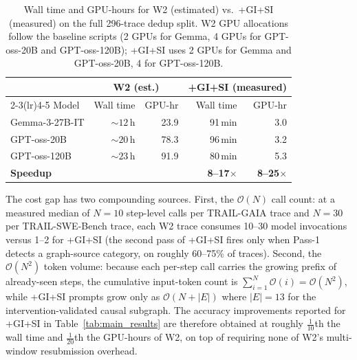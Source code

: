 \begin{table}[h]
\centering
\small
\caption{Wall time and GPU-hours for \textsc{W2} (estimated) vs.\
\textsc{+GI+SI} (measured) on the full 296-trace dedup split.
\textsc{W2} GPU allocations follow the baseline scripts (2 GPUs for
Gemma, 4 GPUs for GPT-oss-20B and GPT-oss-120B);
\textsc{+GI+SI} uses 2 GPUs for Gemma and GPT-oss-20B, 4 for
GPT-oss-120B.}
\label{tab:w2_efficiency}
\begin{tabular}{lrrrr}
\toprule
 & \multicolumn{2}{c}{\textsc{W2} (est.)} & \multicolumn{2}{c}{\textsc{+GI+SI} (measured)} \\
\cmidrule(lr){2-3}\cmidrule(lr){4-5}
Model & Wall time & GPU-hr & Wall time & GPU-hr \\
\midrule
Gemma-3-27B-IT    & ${\sim}12$\,h & 23.9 & 91\,min & 3.0 \\
GPT-oss-20B       & ${\sim}20$\,h & 78.3 & 96\,min & 3.2 \\
GPT-oss-120B      & ${\sim}23$\,h & 91.9 & 80\,min & 5.3 \\
\midrule
\textbf{Speedup}  & \multicolumn{2}{c}{} & \textbf{8--17$\times$} & \textbf{8--25$\times$} \\
\bottomrule
\end{tabular}
\end{table}

The cost gap has two compounding sources.
First, the $\mathcal{O}(N)$ call count: at a measured median of
$N{=}10$ step-level calls per TRAIL-GAIA trace and $N{=}30$ per
TRAIL-SWE-Bench trace, each \textsc{W2} trace consumes 10--30 model
invocations versus 1--2 for \textsc{+GI+SI} (the second pass of
\textsc{+GI+SI} fires only when Pass-1 detects a graph-source
category, on roughly 60--75\% of traces).
Second, the $\mathcal{O}(N^2)$ token volume: because each per-step
call carries the growing prefix of already-seen steps, the cumulative
input-token count is $\sum_{i=1}^{N}\mathcal{O}(i) =
\mathcal{O}(N^2)$, while \textsc{+GI+SI} prompts grow only as
$\mathcal{O}(N + |E|)$ where $|E|{=}13$ for the
intervention-validated causal subgraph.
The accuracy improvements reported for \textsc{+GI+SI} in
Table~\ref{tab:main_results} are therefore obtained at roughly
$\tfrac{1}{10}$th the wall time and $\tfrac{1}{20}$th the GPU-hours
of \textsc{W2}, on top of requiring none of \textsc{W2}'s
multi-window resubmission overhead.

